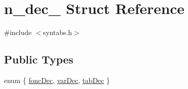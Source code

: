 \hypertarget{structn__dec__}{}\section{n\+\_\+dec\+\_\+ Struct Reference}
\label{structn__dec__}


{\ttfamily \#include $<$syntabs.\+h$>$}

\subsection*{Public Types}
\begin{DoxyCompactItemize}
\item 
enum \{ \hyperlink{structn__dec___ab610188142c8fc3ec72f8948d8fed004a722f1b4321b8bee5b7d54c3ac27af7e8}{fonc\+Dec}, 
\hyperlink{structn__dec___ab610188142c8fc3ec72f8948d8fed004a62e4d33c387745492b5f86bda37b174a}{var\+Dec}, 
\hyperlink{structn__dec___ab610188142c8fc3ec72f8948d8fed004a027a3b177e31cb061fb45d6e60801358}{tab\+Dec}
 \}
\end{DoxyCompactItemize}
